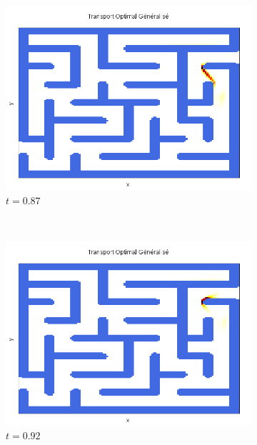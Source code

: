 \documentclass[a4paper,12pt]{article}
\begin{document}
\begin{figure}[!h]
\begin{subfigure}[b]{0.23\linewidth}
\includegraphics[width=\linewidth]{img/2DLabyrinthe/T_00088.png}
\caption*{$t=0.87$}
\end{subfigure}
~
\begin{subfigure}[b]{0.23\linewidth}
\includegraphics[width=\linewidth]{img/2DLabyrinthe/T_00093.png}
\caption*{$t=0.92$}
\end{subfigure}
~
\begin{subfigure}[b]{0.23\linewidth}

\end{subfigure}
\end{figure}
\end{document}
